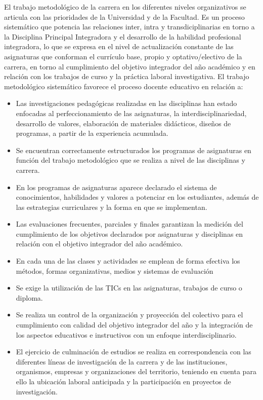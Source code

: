 El trabajo metodológico de la carrera en los diferentes niveles organizativos se articula con las prioridades de la Universidad y de la Facultad. Es un proceso sistemático que potencia las relaciones inter, intra y transdiciplinarias en torno a la Disciplina Principal Integradora y el desarrollo de la habilidad profesional integradora, lo que se expresa en el nivel de actualización constante de las asignaturas que conforman el currículo base, propio y optativo/electivo de la carrera, en torno al cumplimiento del objetivo integrador del año académico y en relación con los trabajos de curso y la práctica laboral investigativa. El trabajo metodológico sistemático favorece el proceso docente educativo en relación a:

\begin{itemize}
	\setlength\itemsep{-0.5em}
	\item Las investigaciones pedagógicas realizadas en las disciplinas han estado enfocadas al perfeccionamiento de las asignaturas, la interdisciplinariedad, desarrollo de valores, elaboración de materiales didácticos, diseños de programas, a partir de la experiencia acumulada.
	\item Se encuentran correctamente estructurados los programas de asignaturas en función del trabajo metodológico que se realiza a nivel de las disciplinas y carrera.
	\item En los programas de asignaturas aparece declarado el sistema de conocimientos, habilidades y valores a potenciar en los estudiantes, además de las estrategias curriculares y la forma en que se implementan.
	\item Las evaluaciones frecuentes, parciales y finales garantizan la medición del cumplimiento de los objetivos declarados por asignaturas y disciplinas en relación con el objetivo integrador del año académico.
	\item En cada una de las clases y actividades se emplean de forma efectiva los métodos, formas organizativas, medios y sistemas de evaluación
	\item Se exige la utilización de las TICs en las asignaturas, trabajos de curso o diploma.
	\item Se realiza un control de la organización y proyección del colectivo para el cumplimiento con calidad del objetivo integrador del año y la integración de los aspectos educativos e instructivos con un enfoque interdisciplinario.
	\item El ejercicio de culminación de estudios se realiza en correspondencia con las diferentes líneas de investigación de la carrera y de las instituciones, organismos, empresas y organizaciones del territorio, teniendo en cuenta para ello la ubicación laboral anticipada y la participación en proyectos de investigación.
\end{itemize}